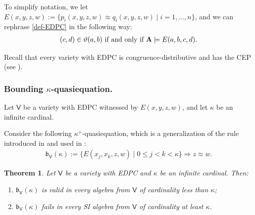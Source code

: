 \documentclass[submission,copyright,creativecommons]{eptcs}
\newtheorem{theorem}{Theorem}[section]
\theoremstyle{definition}
\newcommand{\alg}[1]{{{\textbf{\upshape #1}}}}
\newcommand{\vv}[1]{\mathsf {#1}}
\newcommand{\pVk}{\WsV(\kk)}
\newcommand{\app}{\approx}
\newcommand{\set}[2]{\{#1 \mid #2\}}
\newcommand{\WsV}{\mathfrak{b}_\vv V}
\newcommand{\seq}[2]{#1 \Ra  {#2}}
\newcommand{\kk}{\kappa}
\newcommand{\Ra}{\Rightarrow}
\begin{document}
To simplify notation, we let
$E(x,y,z,w) := \set{ p_i(x,y,z,w) \app q_i(x,y,z,w)}{ i = 1,\dots,n }$,
and we can rephrase \eqref{def-EDPC} in the following way:
\begin{align}
	(c,d) \in \vartheta(a,b) \text{ if and only if } \alg A \models E(a,b,c,d).
	\label
{ex-EDPC}
\end{align}

Recall that every variety with EDPC is congruence-distributive and has the CEP (see \cite[Theorem~1.2]{BlkPgz1}).

\subsubsection*{Bounding $\kk$-quasiequation.}
Let $\vv V$ be a variety with EDPC witnessed by $E(x,y,z,w)$, and let $\kk$ be an infinite cardinal.

Consider the following $\kk^+$-quasiequation, which is a generalization of the rule introduced in \cite{PrucnalStructural1983} and used in \cite{PrucnalStructural1985, RautenbergNote1985, WojtylakSyntactical1990, DzikWojtylakAlmost2015}:
\begin{align}
	\pVk := \seq{\set{E(x_j,x_k,z,w)}{0 \leq j < k < \kk}}{z \app w}.
\end{align}

\begin{theorem}\label{th-infchar}
	Let $\vv V$ be a variety with EDPC and $\kk$ be an infinite cardinal. Then:
	\begin{enumerate}
		\item[(i)] $\pVk$ is valid in every algebra from $\vv V$ of cardinality less than $\kk$;
		\item[(ii)] $\pVk$ fails in every SI algebra from $\vv V$ of cardinality at least $\kk$.
	\end{enumerate}
\end{theorem}
\end{document}
